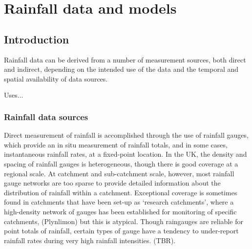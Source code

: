\chapter{Rainfall data and models}
\label{chapter_metdata}

% 
%

\section{Introduction}

Rainfall data can be derived from a number of measurement sources, both direct and indirect, depending on the intended use of the data and the temporal and spatial availability of data sources.

Uses... 

\subsection{Rainfall data sources}
Direct measurement of rainfall is accomplished through the use of rainfall gauges, which provide an in situ measurement of rainfall totals, and in some cases, instantaneous rainfall rates, at a fixed-point location. In the UK, the density and spacing of rainfall gauges is heterogeneous, though there is good coverage at a regional scale. At catchment and sub-catchment scale, however, most rainfall gauge networks are too sparse to provide detailed information about the distribution of rainfall within a catchment. Exceptional coverage is sometimes found in catchments that have been set-up as `research catchments', where a high-density network of gauges has been established for monitoring of specific catchments, (Plynlimon) but this is atypical. Though raingauges are reliable for point totals of rainfall, certain types of gauge have a tendency to under-report rainfall rates during very high rainfall intensities. (TBR). 

